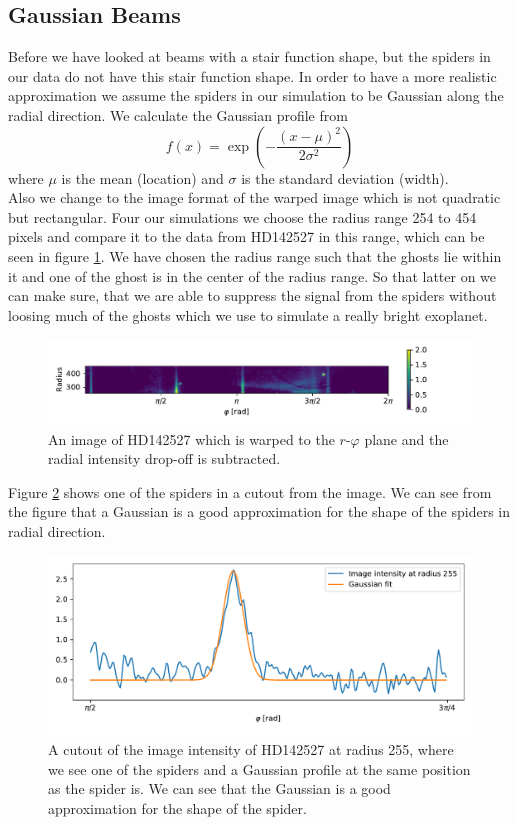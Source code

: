 \subsection{Gaussian Beams}
\label{sec:gaussian}
Before we have looked at beams with a stair function shape, but the spiders in our data do not have this stair function shape. In order to have a more realistic approximation we assume the spiders in our simulation to be Gaussian along the radial direction. We calculate the Gaussian profile from 
\begin{equation}
	f(x) = \exp \left(-\frac{(x-\mu)^2}{2 \sigma^2} \right)
\end{equation}
where $\mu$ is the mean (location) and $\sigma$ is the standard deviation (width). \\
Also we change to the image format of the warped image which is not quadratic but rectangular. Four our simulations we choose the radius range 254 to 454 pixels and compare it to the data from HD142527 in this range, which can be seen in figure \ref{fig:warped_254_454}. We have chosen the radius range such that the ghosts lie within it and one of the ghost is in the center of the radius range. So that latter on we can make sure, that we are able to suppress the signal from the spiders without loosing much of the ghosts which we use to simulate a really bright exoplanet. 
\begin{figure}[H]
	\centering
		\includegraphics[width=1.1\textwidth]{pics/warped_254_454.pdf}
		\caption{An image of HD142527 which is warped to the $r$-$\varphi$ plane and the radial intensity drop-off is subtracted.}
		\label{fig:warped_254_454}
\end{figure}
Figure \ref{fig:spider_gaussian} shows one of the spiders in a cutout from the image. We can see from the figure that a Gaussian is a good approximation for the shape of the spiders in radial direction.
\begin{figure}[H]
	\centering
		\includegraphics[width=1.0\textwidth]{pics/spyder_gaussian.pdf}
		\caption{A cutout of the image intensity of HD142527 at radius 255, where we see one of the spiders and a Gaussian profile at the same position as the spider is. We can see that the Gaussian is a good approximation for the shape of the spider.}
		\label{fig:spider_gaussian}
\end{figure}
